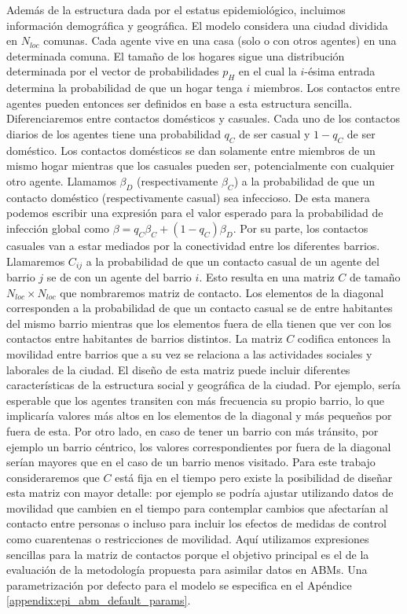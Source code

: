 Además de la estructura dada por el estatus epidemiológico, incluimos información demográfica y geográfica. El modelo considera una ciudad dividida en $N_{loc}$ comunas. Cada agente vive en una casa (solo o con otros agentes) en una determinada comuna. El tamaño de los hogares sigue una distribución determinada por el vector de probabilidades $p_H$ en el cual la $i$-ésima entrada determina la probabilidad de que un hogar tenga $i$ miembros. Los contactos entre agentes pueden entonces ser definidos en base a esta estructura sencilla. Diferenciaremos entre contactos domésticos y casuales. Cada uno de los contactos diarios de los agentes tiene una probabilidad $q_C$ de ser casual y $1 - q_C$ de ser doméstico. Los contactos domésticos se dan solamente entre miembros de un mismo hogar mientras que los casuales pueden ser, potencialmente con cualquier otro agente. Llamamos $\beta_D$ (respectivamente $\beta_C$) a la probabilidad de que un contacto doméstico (respectivamente casual) sea infeccioso. De esta manera podemos escribir una expresión para el valor esperado para la probabilidad de infección global como $\beta = q_C \beta_C + (1 - q_C) \beta_D$. Por su parte, los contactos casuales van a estar mediados por la conectividad entre los diferentes barrios. Llamaremos $C_{ij}$ a la probabilidad de que un contacto casual de un agente del barrio $j$ se de con un agente del barrio $i$. Esto resulta en una matriz $C$ de tamaño $N_{loc} \times N_{loc}$ que nombraremos matriz de contacto. Los elementos de la diagonal corresponden a la probabilidad de que un contacto casual se de entre habitantes del mismo barrio mientras que los elementos fuera de ella tienen que ver con los contactos entre habitantes de barrios distintos. La matriz $C$ codifica entonces la movilidad entre barrios que a su vez se relaciona a las actividades sociales y laborales de la ciudad. El diseño de esta matriz puede incluir diferentes características de la estructura social y geográfica de la ciudad. Por ejemplo, sería esperable que los agentes transiten con más frecuencia su propio barrio, lo que implicaría valores más altos en los elementos de la diagonal y más pequeños por fuera de esta. Por otro lado, en caso de tener un barrio con más tránsito, por ejemplo un barrio céntrico, los valores correspondientes por fuera de la diagonal serían mayores que en el caso de un barrio menos visitado. Para este trabajo consideraremos que $C$ está fija en el tiempo pero existe la posibilidad de diseñar esta matriz con mayor detalle: por ejemplo se podría ajustar utilizando datos de movilidad que cambien en el tiempo para contemplar cambios que afectarían al contacto entre personas o incluso para incluir los efectos de medidas de control como cuarentenas o restricciones de movilidad. Aquí utilizamos expresiones sencillas para la matriz de contactos porque el objetivo principal es el de la evaluación de la metodología propuesta para asimilar datos en ABMs. Una parametrización por defecto para el modelo se especifica en el Apéndice \ref{appendix:epi_abm_default_params}.

